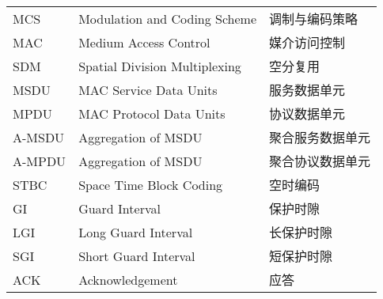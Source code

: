 \begin{supertabular}{lll}
MCS         & \hspace{0.5em}Modulation and Coding Scheme              & \hspace{0.5em}调制与编码策略 \\
MAC         & \hspace{0.5em}Medium Access Control                     & \hspace{0.5em}媒介访问控制 \\
SDM         & \hspace{0.5em}Spatial Division Multiplexing             & \hspace{0.5em}空分复用 \\
MSDU        & \hspace{0.5em}MAC Service Data Units                    & \hspace{0.5em}服务数据单元 \\
MPDU        & \hspace{0.5em}MAC Protocol Data Units                   & \hspace{0.5em}协议数据单元 \\
A-MSDU      & \hspace{0.5em}Aggregation of MSDU                       & \hspace{0.5em}聚合服务数据单元 \\
A-MPDU      & \hspace{0.5em}Aggregation of MSDU                       & \hspace{0.5em}聚合协议数据单元 \\
STBC        & \hspace{0.5em}Space Time Block Coding                   & \hspace{0.5em}空时编码 \\
GI          & \hspace{0.5em}Guard Interval                            & \hspace{0.5em}保护时隙 \\
LGI         & \hspace{0.5em}Long Guard Interval                       & \hspace{0.5em}长保护时隙 \\
SGI         & \hspace{0.5em}Short Guard Interval                      & \hspace{0.5em}短保护时隙 \\
ACK         & \hspace{0.5em}Acknowledgement                           & \hspace{0.5em}应答 \\

\end{supertabular}
